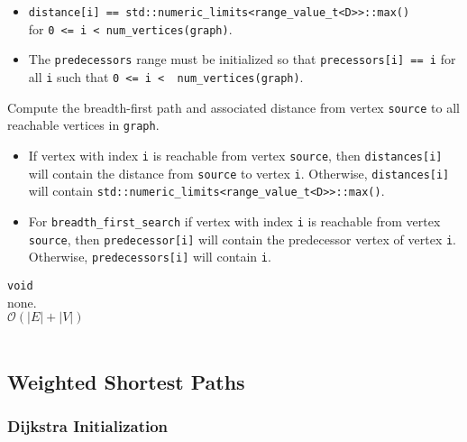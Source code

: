 \begin{itemdescr}
\begin{itemize}
                  \item
                        \lstinline{distance[i] == std::numeric_limits<range_value_t<D>>::max()} \\
                        for \lstinline{0 <= i < num_vertices(graph)}.  
                  \item
                        The \lstinline{predecessors} range must be initialized so that
                        \lstinline{precessors[i] == i} for all \lstinline{i} such that
                        \lstinline{0 <= i <  num_vertices(graph)}.
            \end{itemize}
      \pnum\effects Compute the breadth-first path and associated distance from vertex
                        \lstinline{source} to all reachable vertices in \lstinline{graph}.
      \pnum\result 
            \begin{itemize}
                  \item If vertex with index \lstinline{i} is reachable from vertex \lstinline{source}, then
                        \lstinline{distances[i]} will contain the distance from \lstinline{source} to vertex
                        \lstinline{i}.  Otherwise, \lstinline{distances[i]} will contain
                        \lstinline{std::numeric_limits<range_value_t<D>>::max()}.
                  \item
                        For \lstinline{breadth_first_search} if vertex with index \lstinline{i} is reachable
                        from vertex \lstinline{source}, then \lstinline{predecessor[i]} will contain the
                        predecessor vertex of vertex \lstinline{i}.  Otherwise, \lstinline{predecessors[i]} 
                        will contain \lstinline{i}.
            \end{itemize}
      \pnum\returns \lstinline{void} \\
      \pnum\throws none.  \\
      \pnum\complexity $\mathcal{O}(|E| + |V|)$ \\
      \pnum\remarks \\
\end{itemdescr}


\subsection{Weighted Shortest Paths}

\subsubsection{Dijkstra Initialization}

